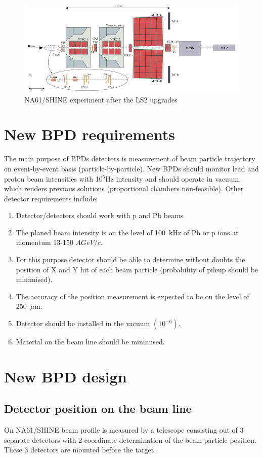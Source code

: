 \documentclass[a4paper]{jpconf}
\begin{document}
\begin{figure}[htbp]
	\centering
	\includegraphics[width=\textwidth]{NA61_scheme.png}
	\caption{\label{fig:1} NA61/SHINE experiment after the LS2 upgrades}
\end{figure}

\section{New BPD requirements}
The main purpose of BPDs detectors is measurement of beam particle trajectory on event-by-event basis (particle-by-particle). New BPDs should monitor lead and proton beam intensities with 10$^5$Hz intensity and should operate in vacuum, which renders previous solutions (proportional chambers non-feasible). Other detector requirements include:
\begin{enumerate}
	\item Detector/detectors should work with p and Pb beams
	\item The planed beam intensity is on the level of 100~kHz of Pb or p ions at momentum 13-150 $AGeV/c$.
	\item For this purpose detector should be able to determine without doubts the position of X and Y hit of each beam particle (probability of pileup should be minimised).
	\item The accuracy of the position measurement is expected to be on the level of 250~$\mu$m.
	\item Detector should be installed in the vacuum $\left(10^{-6}\right)$.
	\item Material on the beam line should be minimised.
\end{enumerate}

\section{New BPD design}

\subsection{Detector position on the beam line}
On NA61/SHINE beam profile is measured by a telescope consisting out of 3 separate detectors with 2-coordinate determination of the beam particle position. These 3 detectors are mounted before the target.
\end{document}
